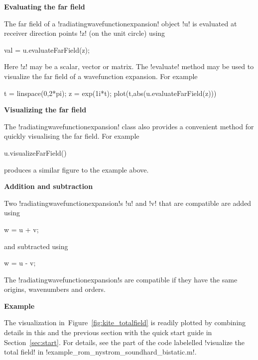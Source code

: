 \documentclass[12pt,letterpaper,final]{article}
\newcommand{\techheading}[1]{%
    \par\vspace{-0.3\parskip}\noindent\hspace{-1cm}\textbf{#1}%
    \par\vspace{-0.5\parskip}\noindent\nopagebreak\ignorespaces}
\begin{document}
\techheading{Evaluating the far field}
The far field of a !radiatingwavefunctionexpansion! object !u! is evaluated at receiver
direction points !z! (on the unit circle) using
\begin{matlab}
val = u.evaluateFarField(z);
\end{matlab}
Here !z! may be a scalar, vector or matrix.
The !evaluate! method may be used to visualize the far field 
of a wavefunction expansion.
For example
\begin{matlab}
t = linspace(0,2*pi);
z = exp(1i*t);
plot(t,abs(u.evaluateFarField(z)))
\end{matlab}

\techheading{Visualizing the far field}
The !radiatingwavefunctionexpansion! class also provides a
convenient method for quickly visualising the far field. 
For example
\begin{matlab}
u.visualizeFarField()
\end{matlab}
produces a similar figure to the example above.

\techheading{Addition and subtraction}
Two !radiatingwavefunctionexpansion!s !u! and !v! 
that are compatible
are added using
\begin{matlab}
w = u + v;
\end{matlab}
and subtracted using
\begin{matlab}
w = u - v;
\end{matlab}
The !radiatingwavefunctionexpansion!s are compatible if they have the same
origins, wavenumbers and orders.

\techheading{Example}
The visualization in~Figure~\ref{fig:kite_totalfield} 
is readily plotted by
combining details in this and the previous section with the quick
start guide in Section~\ref{sec:start}.
For details, see the  part of the code  labelelled !visualize the total field! 
in !example_rom_nystrom_soundhard_bistatic.m!.

\end{document}
